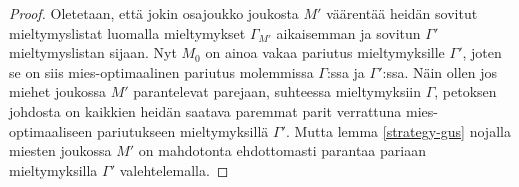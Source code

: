 \documentclass[finnish]{tktltiki2}
\theoremstyle{definition}
\theoremstyle{remark}
\begin{document}
\begin{proof}
	Oletetaan, että jokin osajoukko joukosta $M'$ väärentää heidän sovitut mieltymyslistat luomalla mieltymykset $\Gamma_{M'}$ aikaisemman ja sovitun $\Gamma'$ mieltymyslistan sijaan. Nyt $M_0$ on ainoa vakaa pariutus mieltymyksille $\Gamma'$, joten se on siis mies-optimaalinen pariutus molemmissa $\Gamma$:ssa ja $\Gamma'$:ssa. Näin ollen jos miehet joukossa $M'$ parantelevat parejaan, suhteessa mieltymyksiin $\Gamma$, petoksen johdosta on kaikkien heidän saatava paremmat parit verrattuna mies-optimaaliseen pariutukseen mieltymyksillä $\Gamma'$. Mutta lemma \ref{strategy-gus} nojalla miesten joukossa $M'$ on mahdotonta ehdottomasti parantaa pariaan mieltymyksilla $\Gamma'$ valehtelemalla.
\end{proof}


%
%
% 
%



\end{document}
